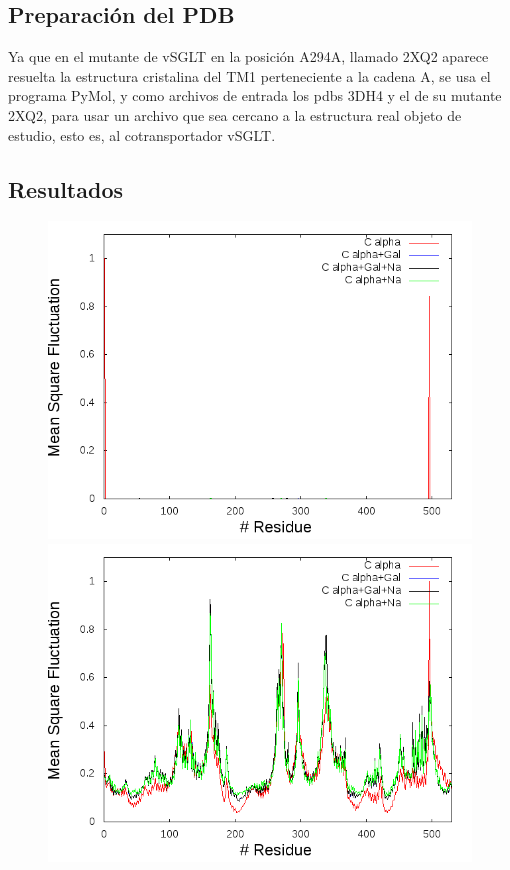 \subsection{Preparaci\'{o}n del PDB}
Ya que en el mutante de vSGLT en la posici\'{o}n A294A, llamado 2XQ2 aparece resuelta la estructura cristalina del TM1 perteneciente a la cadena A, se usa el programa PyMol, y como archivos de entrada los pdbs 3DH4 y el de su mutante 2XQ2, para usar un archivo que sea cercano a la estructura real objeto de estudio, esto es, al cotransportador vSGLT.
\subsection{Resultados}
\begin{figure}
 \centering
  \includegraphics[scale=0.3]{./Kap4/ANM/ANM_server/grafica_7_A_n.png}
 \includegraphics[scale=0.3]{./Kap4/ANM/ANM_server/grafica_8_A_n.png}

\end{figure}
